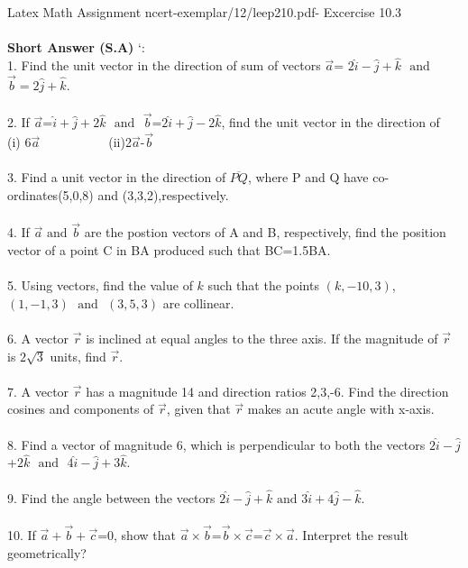 \documentclass{article}
\begin{document}
\textbf{}
\\
\\Latex Math Assignment ncert-exemplar/12/leep210.pdf- Excercise 10.3\\
\textbf{}
\\
\textbf{Short Answer (S.A)}
`:\\
1. Find the unit vector in the direction of sum of vectors $\vec{a}$= $2\hat{i}-\hat{j}+\hat{k}$ $\text{ and }$ $\vec{b}=2\hat{j}+\hat{k}$.
\\
\\
2. If $\vec{a}$=$\hat{i}+\hat{j}+2\hat{k}$ $\text{ and }$ $\vec{b}$=$2\hat{i}+\hat{j}-2\hat{k}$, find the unit vector in the direction of
\\
(i) 6$\vec{a}$   $\hspace{2cm}$ (ii)2$\vec{a}$-$\vec{b}$
\\
\\
3. Find a unit vector in the direction of $\overline{PQ} $, where P and Q have co-ordinates(5,0,8) and (3,3,2),respectively.
\\
\\
4. If $\vec{a}$ $\text{and}$ $\vec{b}$ are the postion vectors of A and B, respectively, find the position vector of a point C in BA produced such that BC=1.5BA.
\\
\\
5. Using vectors, find the value of $k$ such that the points $(k,-10,3)$, $(1,-1,3)$ $\text{ and }$ $(3,5,3)$ are collinear.
\\
\\
6. A vector $\vec{r}$ is inclined at equal angles to the three axis. If the magnitude of $\vec{r}$ is $2\sqrt{3}$ units, find $\vec{r}$.
\\
\\
7. A vector $\vec{r}$ has a magnitude 14 and direction ratios 2,3,-6. Find the direction cosines and components of $\vec{r}$, given that $\vec{r}$ makes an acute angle with x-axis.
\\
\\
8. Find a vector of magnitude 6, which is perpendicular to both the vectors $2\hat{i}-\hat{j}$+$2\hat{k}$ $\text{ and }$ $4\hat{i}-\hat{j}+3\hat{k}$.
\\
\\
9. Find the angle between the vectors $2\hat{i}-\hat{j}+\hat{k}$ $\text{and}$ $3\hat{i}+4\hat{j}-\hat{k}$.
\\
\\
10. If $\vec{a}+\vec{b}+\vec{c}$=0, show that $\vec{a}\times\vec{b}$=$\vec{b}\times\vec{c}$=$\vec{c}\times\vec{a}$. Interpret the result geometrically?
\end{document}
